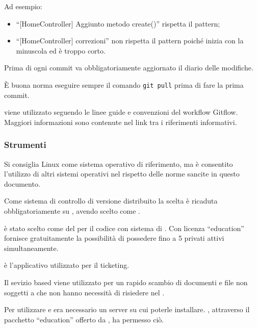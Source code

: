 \documentclass[a4paper, titlepage]{article}
\begin{document}
Ad esempio:
\begin{itemize}
	\item ``[HomeController] Aggiunto metodo create()'' rispetta il pattern;
	\item ``[HomeController] correzioni'' non rispetta il pattern poiché inizia con la minuscola ed è troppo corto. 
\end{itemize}

Prima di ogni commit va obbligatoriamente aggiornato il diario delle modifiche.

È buona norma eseguire sempre il comando \texttt{git pull} prima di fare la prima commit.

 viene utilizzato seguendo le linee guide e convenzioni del workflow Gitflow. Maggiori informazioni sono contenute nel link tra i riferimenti informativi.

\subsubsection{Strumenti}

Si consiglia Linux come sistema operativo di riferimento, ma è consentito l'utilizzo di altri sistemi operativi nel rispetto delle norme sancite in questo documento.

Come sistema di controllo di versione distribuito la scelta è ricaduta obbligatoriamente su , avendo scelto  come .

 è stato scelto come  del  per il codice con sistema di  .
Con licenza ``education'' fornisce gratuitamente la possibilità di possedere fino a 5  privati attivi simultaneamente.

 è l'applicativo utilizzato per il ticketing.

Il sevizio  based  viene utilizzato per un rapido scambio di documenti e file non soggetti a  che non hanno necessità di risiedere nel .

Per utilizzare  e  era necessario un server su cui poterle installare. , attraverso il pacchetto ``education'' offerto da , ha permesso ciò.
\end{document}
